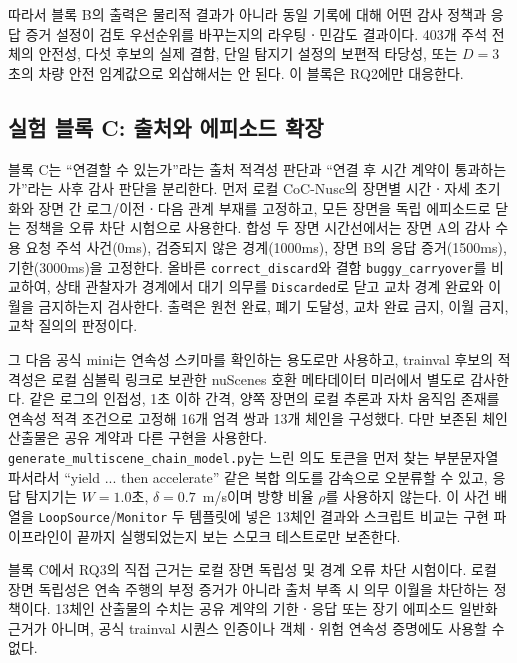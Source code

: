 따라서 블록 B의 출력은 물리적 결과가 아니라 동일 기록에 대해 어떤 감사 정책과 응답 증거 설정이 검토 우선순위를 바꾸는지의 라우팅ㆍ민감도 결과이다. 403개 주석 전체의 안전성, 다섯 후보의 실제 결함, 단일 탐지기 설정의 보편적 타당성, 또는 $D=3$초의 차량 안전 임계값으로 외삽해서는 안 된다. 이 블록은 RQ2에만 대응한다.

\subsection{실험 블록 C: 출처와 에피소드 확장}
\label{sec:exp-block-c}

블록 C는 ``연결할 수 있는가''라는 출처 적격성 판단과 ``연결 후 시간 계약이 통과하는가''라는 사후 감사 판단을 분리한다. 먼저 로컬 CoC-Nusc의 장면별 시간ㆍ자세 초기화와 장면 간 로그/이전ㆍ다음 관계 부재를 고정하고, 모든 장면을 독립 에피소드로 닫는 정책을 오류 차단 시험으로 사용한다. 합성 두 장면 시간선에서는 장면 A의 감사 수용 요청 주석 사건(0ms), 검증되지 않은 경계(1000ms), 장면 B의 응답 증거(1500ms), 기한(3000ms)을 고정한다. 올바른 \texttt{correct\_discard}와 결함 \texttt{buggy\_carryover}를 비교하여, 상태 관찰자가 경계에서 대기 의무를 \texttt{Discarded}로 닫고 교차 경계 완료와 이월을 금지하는지 검사한다. 출력은 원천 완료, 폐기 도달성, 교차 완료 금지, 이월 금지, 교착 질의의 판정이다.

그 다음 공식 mini는 연속성 스키마를 확인하는 용도로만 사용하고, trainval 후보의 적격성은 로컬 심볼릭 링크로 보관한 nuScenes 호환 메타데이터 미러에서 별도로 감사한다. 같은 로그의 인접성, 1초 이하 간격, 양쪽 장면의 로컬 추론과 자차 움직임 존재를 연속성 적격 조건으로 고정해 16개 엄격 쌍과 13개 체인을 구성했다. 다만 보존된 체인 산출물은 공유 계약과 다른 구현을 사용한다. \texttt{generate\_multiscene\_chain\_model.py}는 느린 의도 토큰을 먼저 찾는 부분문자열 파서라서 ``yield ... then accelerate'' 같은 복합 의도를 감속으로 오분류할 수 있고, 응답 탐지기는 $W=1.0$초, $\delta=0.7$~m/s이며 방향 비율 $\rho$를 사용하지 않는다. 이 사건 배열을 \texttt{LoopSource}/\texttt{Monitor} 두 템플릿에 넣은 13체인 결과와 스크립트 비교는 구현 파이프라인이 끝까지 실행되었는지 보는 스모크 테스트로만 보존한다.

블록 C에서 RQ3의 직접 근거는 로컬 장면 독립성 및 경계 오류 차단 시험이다. 로컬 장면 독립성은 연속 주행의 부정 증거가 아니라 출처 부족 시 의무 이월을 차단하는 정책이다. 13체인 산출물의 수치는 공유 계약의 기한ㆍ응답 또는 장기 에피소드 일반화 근거가 아니며, 공식 trainval 시퀀스 인증이나 객체ㆍ위험 연속성 증명에도 사용할 수 없다.

